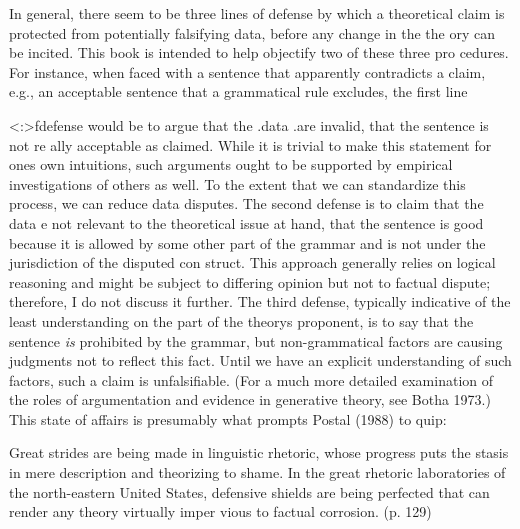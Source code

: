 \begin{styleStandard}
In general, there seem to be three lines of defense by which a theoretical claim is protected from potentially falsifying data, before any change in the the\- ory can be incited. This book is intended to help objectify two of these three pro\- cedures. For instance, when faced with a sentence that apparently contradicts a claim, e.g., an acceptable sentence that a grammatical rule excludes, the first line
\end{styleStandard}


\begin{styleStandard}
{\textless}:{\textgreater}fdefense would be to argue that the .data .are invalid, that the sentence is not re\- ally acceptable as claimed. While it is trivial to make this statement for one{\textquotesingle}s own intuitions, such arguments ought to be supported by empirical investigations of others as well.{\textquotesingle} To the extent that we can standardize this process, we can reduce data disputes. The second defense is to claim that the data e not relevant to the theoretical issue at hand, that the sentence is good because it is allowed by some other part of the grammar and is not under the jurisdiction of the disputed con\- struct. This approach generally relies on logical reasoning and might be subject to differing opinion but not to factual dispute; therefore, I do not discuss it further. The third defense, typically indicative of the least understanding on the part of the theory{\textquotesingle}s proponent, is to say that the sentence \textit{is}\textit{ }prohibited by the grammar, but non-grammatical factors are causing judgments not to reflect this fact. Until we have an explicit understanding of such factors, such a claim is unfalsifiable. (For a much more detailed examination of the roles of argumentation and evidence in generative theory, see Botha 1973.) This state of affairs is presumably what prompts Postal (1988) to quip:
\end{styleStandard}


\clearpage\setcounter{page}{1}\begin{styleTextbody}
Great strides are being made in linguistic rhetoric, whose progress puts the stasis in mere description and theorizing to shame. In the great rhetoric laboratories of the north-eastern United States, defensive shields are being perfected that can render any theory virtually imper\- vious to factual corrosion. (p. 129)
\end{styleTextbody}


